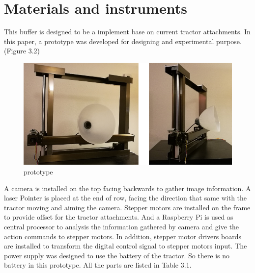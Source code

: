 \documentclass[letterpaper,12pt,oneside]{book}
\begin{document}
		\section{Materials and instruments}
		This buffer is designed to be a implement base on current tractor attachments. In this paper, a prototype was developed for designing and experimental purpose. (Figure 3.2) 
		\begin{figure}[ht!]
			\begin{center}
				\includegraphics[scale = 0.6]{prototype.png}
				\caption{prototype}
			\end{center}
		\end{figure}
		A camera is installed on the top facing backwards to gather image information. A laser Pointer is placed at the end of row, facing the direction that same with the tractor moving and aiming the camera. Stepper motors are installed on the frame to provide offset for the tractor attachments. And a Raspberry Pi is used as central processor to analysis the information gathered by camera and give the action commands to stepper motors. In addition, stepper motor drivers boards are installed to transform the digital control signal to stepper motors input. The power supply was designed to use the battery of the tractor. So there is no battery in this prototype. All the parts are listed in Table 3.1.
		
\end{document}
